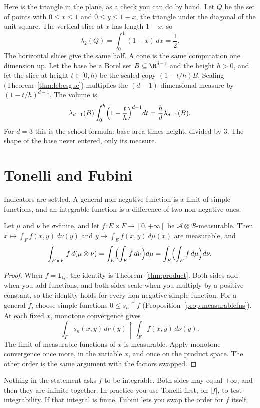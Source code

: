 Here is the triangle in the plane, as a check you can do by hand. Let $Q$ be the set of points with $0\le x\le 1$ and $0\le y\le 1-x$, the triangle under the diagonal of the unit square. The vertical slice at $x$ has length $1-x$, so
\[
\lambda_2(Q)=\int_0^1(1-x)\,dx=\frac12.
\]
The horizontal slices give the same half. A cone is the same computation one dimension up. Let the base be a Borel set $B\subseteq\R^{d-1}$ and the height $h>0$, and let the slice at height $t\in[0,h)$ be the scaled copy $(1-t/h)B$. Scaling (Theorem~\ref{thm:lebesgue}) multiplies the $(d-1)$-dimensional measure by $(1-t/h)^{d-1}$. The volume is
\[
\lambda_{d-1}(B)\int_0^h\Bigl(1-\frac th\Bigr)^{d-1}dt=\frac hd\lambda_{d-1}(B).
\]
For $d=3$ this is the school formula: base area times height, divided by $3$. The shape of the base never entered, only its measure.

\section{Tonelli and Fubini}

Indicators are settled. A general non-negative function is a limit of simple functions, and an integrable function is a difference of two non-negative ones.

\begin{theorem}[Tonelli]\label{thm:tonelli}
Let $\mu$ and $\nu$ be $\sigma$-finite, and let $f:E\times F\to[0,+\infty]$ be $\mathcal A\otimes\mathcal B$-measurable. Then $x\mapsto\int_F f(x,y)\,d\nu(y)$ and $y\mapsto\int_E f(x,y)\,d\mu(x)$ are measurable, and
\[\int_{E\times F}f\,d(\mu\otimes\nu)=\int_E\Bigl(\int_Ff\,d\nu\Bigr)d\mu=\int_F\Bigl(\int_Ef\,d\mu\Bigr)d\nu.\]
\end{theorem}
\begin{proof}
When $f=\mathbf 1_Q$, the identity is Theorem~\ref{thm:product}. Both sides add when you add functions, and both sides scale when you multiply by a positive constant, so the identity holds for every non-negative simple function. For a general $f$, choose simple functions $0\le s_n\uparrow f$ (Proposition~\ref{prop:measurablefns}). At each fixed $x$, monotone convergence gives
\[
\int_F s_n(x,y)\,d\nu(y)\uparrow\int_F f(x,y)\,d\nu(y).
\]
The limit of measurable functions of $x$ is measurable. Apply monotone convergence once more, in the variable $x$, and once on the product space. The other order is the same argument with the factors swapped.
\end{proof}

Nothing in the statement asks $f$ to be integrable. Both sides may equal $+\infty$, and then they are infinite together. In practice you use Tonelli first, on $|f|$, to test integrability. If that integral is finite, Fubini lets you swap the order for $f$ itself.

